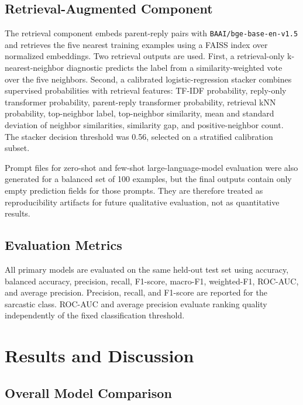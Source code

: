 \documentclass[%
 reprint,
 amsmath,amssymb,
 aps,
]{revtex4-2}
\begin{document}
\subsection*{Retrieval-Augmented Component}

The retrieval component embeds parent-reply pairs with \texttt{BAAI/bge-base-en-v1.5} and retrieves the five nearest training examples using a FAISS index over normalized embeddings. Two retrieval outputs are used. First, a retrieval-only k-nearest-neighbor diagnostic predicts the label from a similarity-weighted vote over the five neighbors. Second, a calibrated logistic-regression stacker combines supervised probabilities with retrieval features: TF-IDF probability, reply-only transformer probability, parent-reply transformer probability, retrieval kNN probability, top-neighbor label, top-neighbor similarity, mean and standard deviation of neighbor similarities, similarity gap, and positive-neighbor count. The stacker decision threshold was 0.56, selected on a stratified calibration subset.

Prompt files for zero-shot and few-shot large-language-model evaluation were also generated for a balanced set of 100 examples, but the final outputs contain only empty prediction fields for those prompts. They are therefore treated as reproducibility artifacts for future qualitative evaluation, not as quantitative results.

\subsection*{Evaluation Metrics}

All primary models are evaluated on the same held-out test set using accuracy, balanced accuracy, precision, recall, F1-score, macro-F1, weighted-F1, ROC-AUC, and average precision. Precision, recall, and F1-score are reported for the sarcastic class. ROC-AUC and average precision evaluate ranking quality independently of the fixed classification threshold.

\section{\label{sec:results}Results and Discussion} %

\subsection*{Overall Model Comparison}
\end{document}
